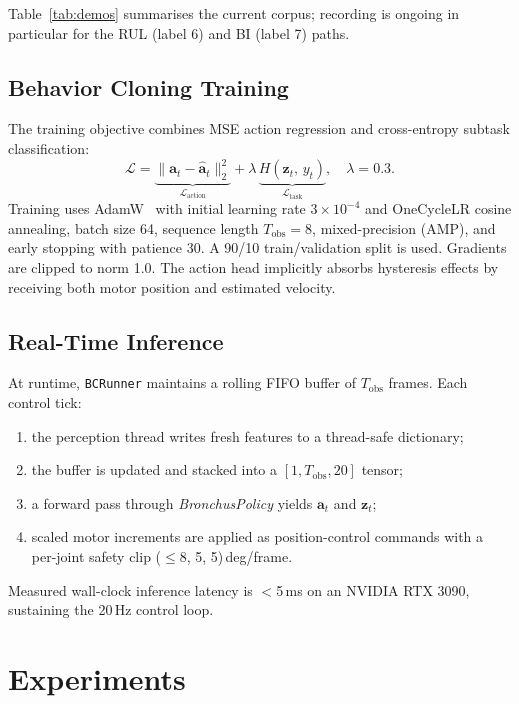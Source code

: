 \documentclass[journal,comsoc]{IEEEtran}
\newcommand{\Tobs}{T_{\text{obs}}}
\newcommand{\act}{\mathbf{a}}
\begin{document}
Table~\ref{tab:demos} summarises the current corpus; recording is
ongoing in particular for the RUL (label 6) and BI (label 7) paths.

\subsection{Behavior Cloning Training}
The training objective combines MSE action regression and
cross-entropy subtask classification:
\begin{equation}
  \mathcal{L} = \underbrace{\|\act_t - \hat{\act}_t\|_2^2}_{\mathcal{L}_\text{action}}
              + \lambda\,\underbrace{H(\mathbf{z}_t,\, y_t)}_{\mathcal{L}_\text{task}},
  \quad \lambda = 0.3.
  \label{eq:loss}
\end{equation}
Training uses AdamW~\cite{loshchilov2017adamw} with initial learning
rate $3\!\times\!10^{-4}$ and OneCycleLR cosine annealing, batch
size 64, sequence length $\Tobs\!=\!8$, mixed-precision (AMP), and
early stopping with patience 30. A 90/10 train/validation split is
used. Gradients are clipped to norm 1.0. The action head implicitly
absorbs hysteresis effects \cite{cho2024hysteresis} by receiving both
motor position and estimated velocity.

\subsection{Real-Time Inference}
At runtime, \texttt{BCRunner} maintains a rolling FIFO buffer of
$\Tobs$ frames. Each control tick:
\begin{enumerate}[leftmargin=*,topsep=1pt,itemsep=0pt]
\item the perception thread writes fresh features to a thread-safe
      dictionary;
\item the buffer is updated and stacked into a $[1, \Tobs, 20]$
      tensor;
\item a forward pass through \textit{BronchusPolicy} yields
      $\act_t$ and $\mathbf{z}_t$;
\item scaled motor increments are applied as position-control
      commands with a per-joint safety clip
      ($\le$8, 5, 5)\,deg/frame.
\end{enumerate}
Measured wall-clock inference latency is $<$5\,ms on an NVIDIA RTX
3090, sustaining the 20\,Hz control loop.

\section{Experiments}
\label{sec:experiments}
\end{document}
